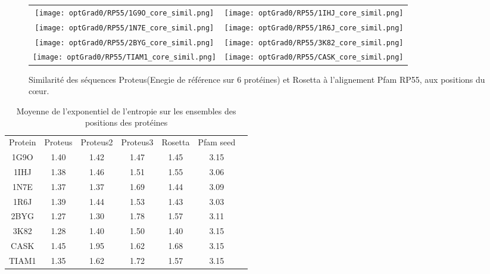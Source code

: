     \clearpage
    \thispagestyle{empty}
   \begin{figure}[t]
     \centering
     \begin{tabular}{cc}
       \texttt{[image: optGrad0/RP55/1G9O\_core\_simil.png]} &
       \texttt{[image: optGrad0/RP55/1IHJ\_core\_simil.png]} \\
       \texttt{[image: optGrad0/RP55/1N7E\_core\_simil.png]} &
       \texttt{[image: optGrad0/RP55/1R6J\_core\_simil.png]} \\
       \texttt{[image: optGrad0/RP55/2BYG\_core\_simil.png]} &
       \texttt{[image: optGrad0/RP55/3K82\_core\_simil.png]} \\
       \texttt{[image: optGrad0/RP55/TIAM1\_core\_simil.png]} &
       \texttt{[image: optGrad0/RP55/CASK\_core\_simil.png]} \\ 
     \end{tabular}
    \caption{Similarité des séquences Proteus(Enegie de référence sur 6 protéines) et Rosetta à l'alignement Pfam RP55, aux positions du cœur.}

\label{graph:Simil_Proteus_PDZ}
   \end{figure}

    \clearpage

    \begin{table}[!htbp]
      \centering

      \begin{tabular}{ccccccc}

        \toprule
        Protein & Proteus &  Proteus2 &  Proteus3 & Rosetta & Pfam seed \\
        \cmidrule{1-6}
        1G9O  & 1.40 & 1.42 & 1.47 & 1.45 & 3.15  \\
        1IHJ  & 1.38 & 1.46 & 1.51 & 1.55 & 3.06  \\
        1N7E  & 1.37 & 1.37 & 1.69 & 1.44 & 3.09  \\
        1R6J  & 1.39 & 1.44 & 1.53 & 1.43 & 3.03  \\
        2BYG  & 1.27 & 1.30 & 1.78 & 1.57 & 3.11  \\
        3K82  & 1.28 & 1.40 & 1.50 & 1.40 & 3.15  \\
        CASK  & 1.45 & 1.95 & 1.62 & 1.68 & 3.15  \\
        TIAM1 & 1.35 & 1.62 & 1.72 & 1.57 & 3.15  \\
        \bottomrule

      \end{tabular}      
      \caption{Moyenne de l'exponentiel de l'entropie sur les ensembles des positions des protéines}
\label{tab:Entropie_PDZ}      
    \end{table}

